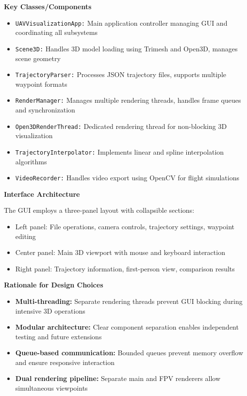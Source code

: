 \documentclass[11pt,a4paper]{article}
\begin{document}
\textbf{Key Classes/Components}

\begin{itemize}
\item \texttt{UAVVisualizationApp:} Main application controller managing GUI and coordinating all subsystems
\item \texttt{Scene3D:} Handles 3D model loading using Trimesh and Open3D, manages scene geometry
\item \texttt{TrajectoryParser:} Processes JSON trajectory files, supports multiple waypoint formats
\item \texttt{RenderManager:} Manages multiple rendering threads, handles frame queues and synchronization
\item \texttt{Open3DRenderThread:} Dedicated rendering thread for non-blocking 3D visualization
\item \texttt{TrajectoryInterpolator:} Implements linear and spline interpolation algorithms
\item \texttt{VideoRecorder:} Handles video export using OpenCV for flight simulations
\end{itemize}

\textbf{Interface Architecture}

The GUI employs a three-panel layout with collapsible sections:
\begin{itemize}
\item Left panel: File operations, camera controls, trajectory settings, waypoint editing
\item Center panel: Main 3D viewport with mouse and keyboard interaction
\item Right panel: Trajectory information, first-person view, comparison results
\end{itemize}

\textbf{Rationale for Design Choices}

\begin{itemize}
\item \textbf{Multi-threading:} Separate rendering threads prevent GUI blocking during intensive 3D operations
\item \textbf{Modular architecture:} Clear component separation enables independent testing and future extensions
\item \textbf{Queue-based communication:} Bounded queues prevent memory overflow and ensure responsive interaction
\item \textbf{Dual rendering pipeline:} Separate main and FPV renderers allow simultaneous viewpoints
\end{itemize}
\end{document}
